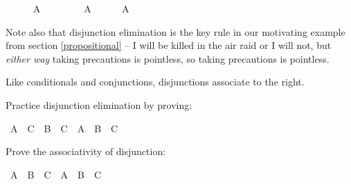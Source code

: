 \begin{isabellebody}
\ \ \ \ \isamarkupfalse%
\ {\isachardoublequoteopen}A{\isachardoublequoteclose}\isacommand{{\isachardot}}\isamarkupfalse%
\isanewline
\ \ \isamarkupfalse%
\isanewline
\ \ \ \ \isamarkupfalse%
\ {\isachardoublequoteopen}A{\isachardoublequoteclose}\isanewline
\ \ \ \ \isamarkupfalse%
\ {\isachardoublequoteopen}A{\isachardoublequoteclose}\isacommand{{\isachardot}}\isamarkupfalse%
\isanewline
\ \ \isamarkupfalse%
\isanewline
{}\isamarkupfalse%
%
\endisatagproof
{\isafoldproof}%
%
\isadelimproof
%
\endisadelimproof
%
\begin{isamarkuptext}%
Note also that disjunction elimination is the key rule in our motivating example from
section \ref{propositional} -- I will be killed in the air raid or I will not, but \emph{either way}
taking precautions is pointless, so taking precautions is pointless.%
\end{isamarkuptext}\isamarkuptrue%
%
\begin{isamarkuptext}%
Like conditionals and conjunctions, disjunctions associate to the right.%
\end{isamarkuptext}\isamarkuptrue%
%
\begin{isamarkuptext}%
\begin{Exercise} Practice disjunction elimination by proving: \end{Exercise}%
\end{isamarkuptext}\isamarkuptrue%
\isamarkupfalse%
\ {\isachardoublequoteopen}{\isacharparenleft}A\ {\isasymlongrightarrow}\ C{\isacharparenright}\ {\isasymand}\ {\isacharparenleft}B\ {\isasymlongrightarrow}\ C{\isacharparenright}\ {\isasymlongrightarrow}\ A\ {\isasymor}\ B\ {\isasymlongrightarrow}\ C{\isachardoublequoteclose}%
\isadelimproof
\ %
\endisadelimproof
%
\isatagproof
{}\isamarkupfalse%
%
\endisatagproof
{\isafoldproof}%
%
\isadelimproof
%
\endisadelimproof
%
\begin{isamarkuptext}%
\begin{Exercise}[title = The Associativity of Disjunction] 
Prove the associativity of disjunction: \end{Exercise}%
\end{isamarkuptext}\isamarkuptrue%
\isamarkupfalse%
\ {\isachardoublequoteopen}A\ {\isasymor}\ B\ {\isasymor}\ C\ {\isasymlongleftrightarrow}\ {\isacharparenleft}A\ {\isasymor}\ B{\isacharparenright}\ {\isasymor}\ C{\isachardoublequoteclose}%
\isadelimproof
\ %
\endisadelimproof
%
\isatagproof

\end{isabellebody}
